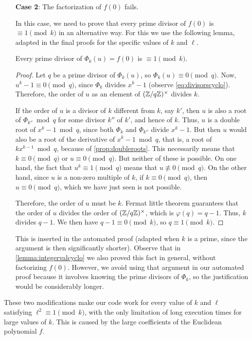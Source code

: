 \documentclass[../main.tex]{subfiles}
\begin{document}
\begin{enumerate}[align=left]
	\item[\textbf{Case 2}:] The factorization of $f(0)$ fails.
	
	In this case, we need to prove that every prime divisor of $f(0)$ is $\equiv 1\pmod{k}$ in an alternative way. For this we use the following lemma, adapted in the final proofs for the specific values of $k$ and $\ell$.
	\begin{lemma}
		Every prime divisor of $\Phi_{k}(u)=f(0)$ is $\equiv 1\pmod{k}$.
	\end{lemma}
	\begin{proof}
		Let $q$ be a prime divisor of $\Phi_{k}(u)$, so $\Phi_{k}(u)\equiv 0\pmod{q}$. Now, $u^{k}-1\equiv 0\pmod{q}$, since $\Phi_{k}$ divides $x^{k}-1$ (observe \cref{eq:divisorscyclo}). Therefore, the order of $u$ as an element of $(\mathbb{Z}/q\mathbb{Z})^\times$ divides $k$. 
		
		If the order of $u$ is a divisor of $k$ different from $k$, say $k'$, then $u$ is also a root of $\Phi_{k''} \bmod{q}$ for some divisor $k''$ of $k'$, and hence of $k$. Thus, $u$ is a double root of $x^{k}-1 \bmod{q}$, since both $\Phi_{k}$ and $\Phi_{k''}$ divide $x^{k}-1$. But then $u$ would also be a root of the derivative of $x^{k}-1 \bmod{q}$, that is, a root of $kx^{k-1} \bmod{q}$, because of \cref{prop:doubleroots}. This necessarily means that $k\equiv 0\pmod{q}$ or $u\equiv 0\pmod{q}$. But neither of these is possible. On one hand, the fact that $u^{k}\equiv 1\pmod{q}$ means that $u\not\equiv 0\pmod{q}$. On the other hand, since $u$ is a non-zero multiple of $k$, if $k\equiv 0\pmod{q}$, then $u\equiv 0\pmod{q}$, which we have just seen is not possible.
		
		Therefore, the order of $u$ must be $k$. Fermat little theorem guarantees that the order of $u$ divides the order of $(\mathbb{Z}/q\mathbb{Z})^\times$, which is $\varphi(q)=q-1$. Thus, $k$ divides $q-1$. We then have $q-1\equiv 0\pmod{k}$, so $q\equiv 1\pmod{k}$.
	\end{proof}
	This is inserted in the automated proof (adapted when $k$ is a prime, since the argument is then significantly shorter). Observe that in \cref{lemma:integervalcyclo} we also proved this fact in general, without factorizing $f(0)$. However, we avoid using that argument in our automated proof because it involves knowing the prime divisors of $\Phi_{k}$, so the justification would be considerably longer.
\end{enumerate}

These two modifications make our code work for every value of $k$ and $\ell$ satisfying $\ell^2\equiv 1\pmod{k}$, with the only limitation of long execution times for large values of $k$. This is caused by the large coefficients of the Euclidean polynomial $f$.
\end{document}
